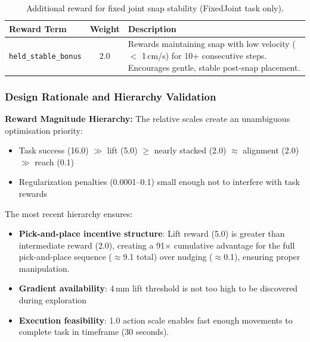 \documentclass[12pt,a4paper,oneside]{report}
\begin{document}
\begin{table}[h]
\centering
\small
\begin{tabular}{|l|c|p{8cm}|}
\hline
\textbf{Reward Term} & \textbf{Weight} & \textbf{Description} \\
\hline
\texttt{held\_stable\_bonus} & 2.0 & Rewards maintaining snap with low velocity ($<$ 1\,cm/s) for 10+ consecutive steps. Encourages gentle, stable post-snap placement. \\
\hline
\end{tabular}
\caption{Additional reward for fixed joint snap stability (FixedJoint task only).}
\end{table}

\subsubsection{Design Rationale and Hierarchy Validation}

\textbf{Reward Magnitude Hierarchy:}
The relative scales create an unambiguous optimisation priority:
\begin{itemize}
    \item Task success (16.0) $\gg$ lift (5.0) $\geq$ nearly stacked (2.0) $\approx$ alignment (2.0) $\gg$ reach (0.1)
    \item Regularization penalties (0.0001--0.1) small enough not to interfere with task rewards
\end{itemize}

The most recent hierarchy ensures:
\begin{itemize}
    \item \textbf{Pick-and-place incentive structure}: Lift reward (5.0) is greater than intermediate reward (2.0), creating a 91$\times$ cumulative advantage for the full pick-and-place sequence ($\approx$9.1 total) over nudging ($\approx$0.1), ensuring proper manipulation.
    \item \textbf{Gradient availability}: 4\,mm lift threshold is not too high to be discovered during exploration
    \item \textbf{Execution feasibility}: 1.0 action scale enables fast enough movements to complete task in timeframe (30 seconds).
\end{itemize}
\end{document}
